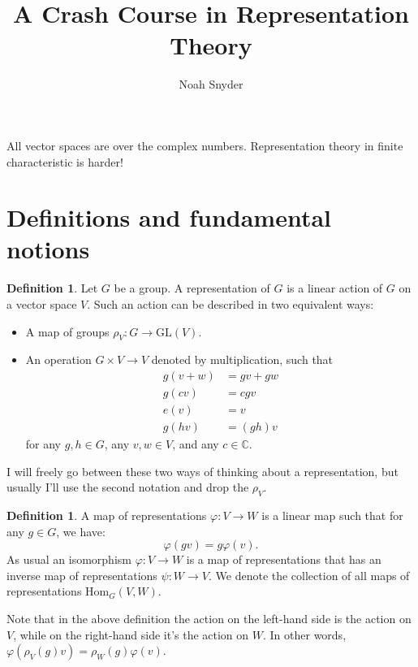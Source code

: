 \documentclass[11pt]{article}
\theoremstyle{plain}
\theoremstyle{definition}
\newtheorem{definition}[proposition]{Definition}
\theoremstyle{remark}
\begin{document}
\title{A Crash Course in Representation Theory}
\author{Noah Snyder}
\maketitle

All vector spaces are over the complex numbers. Representation theory in finite characteristic is harder!

\section{Definitions and fundamental notions}

\begin{definition}
Let $G$ be a group.  A representation of $G$ is a linear action of $G$ on a vector space $V$.  Such an action can be described in two equivalent ways:
\begin{itemize}
\item A map of groups $\rho_V: G \rightarrow \mathrm{GL}(V)$.
\item An operation $G \times V \rightarrow V$ denoted by multiplication, such that 
\begin{align*}
g(v+w) &= gv+gw \\
g(cv) &= c gv\\
e(v) &= v \\
g(hv) &=(gh)v
\end{align*}
 for any $g, h \in G$, any $v,w \in V$, and any $c \in \mathbb{C}$.
\end{itemize}
\end{definition}

I will freely go between these two ways of thinking about a representation, but usually I'll use the second notation and drop the $\rho_V$.

\begin{definition}
A map of representations $\varphi: V \rightarrow W$ is a linear map such that for any $g \in G$, we have:
$$\varphi(gv) = g \varphi(v).$$
As usual an isomorphism $\varphi: V \rightarrow W$ is a map of representations that has an inverse map of representations $\psi:W \rightarrow V$.
We denote the collection of all maps of representations $\mathrm{Hom}_G(V,W)$.
\end{definition}

Note that in the above definition the action on the left-hand side is the action on $V$, while on the right-hand side it's the action on $W$.  In other words, $\varphi(\rho_V(g)v) = \rho_W(g)\varphi(v)$.
\end{document}
